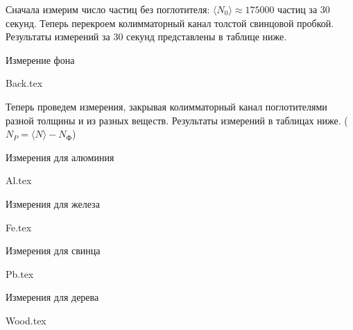 Сначала измерим число частиц без поглотителя: $\langle N_0 \rangle \approx
175000$ частиц за $30$ секунд. Теперь перекроем колимматорный канал толстой
свинцовой пробкой. Результаты измерений за 30 секунд представлены в таблице
ниже.

\begin{table}[h!]
  \centering
  \caption{Измерение фона}
  {Back.tex}
\end{table}

Теперь проведем измерения, закрывая колимматорный канал поглотителями разной
толщины и из разных веществ. Результаты измерений в таблицах ниже. ($N_P =
\langle N \rangle - N_{\text{Ф}}$)

\begin{table}[h!]
  \centering
  \caption{Измерения для алюминия}
  {Al.tex}
\end{table}

\begin{table}
  \centering
  \caption{Измерения для железа}
  {Fe.tex}
\end{table}

\begin{table}
  \centering
  \caption{Измерения для свинца}
  {Pb.tex}
\end{table}

\begin{table}
  \centering
  \caption{Измерения для дерева}
  {Wood.tex}
\end{table}


